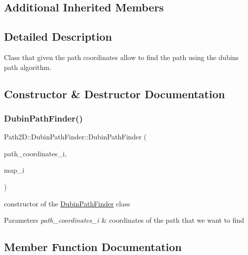 \subsection*{Additional Inherited Members}


\subsection{Detailed Description}
Class that given the path coordinates allow to find the path using the dubins path algorithm. 

\subsection{Constructor \& Destructor Documentation}
\mbox{\label{class_path2_d_1_1_dubin_path_finder_a663ec1b97f56c4a36cbe242752d1253a}} 
\subsubsection{\texorpdfstring{Dubin\+Path\+Finder()}{DubinPathFinder()}}
{\footnotesize\ttfamily Path2\+D\+::\+Dubin\+Path\+Finder\+::\+Dubin\+Path\+Finder (\begin{DoxyParamCaption}\item[{\mbox{\hyperlink{class_path2_d_1_1_element_1_1_path_coordinates}{Path\+Coordinates}}}]{path\+\_\+coordinates\+\_\+i,  }\item[{\mbox{\hyperlink{class_map}{Map}} $\ast$}]{map\+\_\+i }\end{DoxyParamCaption})}



constructor of the \mbox{\hyperlink{class_path2_d_1_1_dubin_path_finder}{Dubin\+Path\+Finder}} class 


\begin{DoxyParams}{Parameters}
{\em path\+\_\+coordinates\+\_\+i} & coordinates of the path that we want to find \\
\hline
\end{DoxyParams}


\subsection{Member Function Documentation}
\mbox{\label{class_path2_d_1_1_dubin_path_finder_abc1e93ad55c02aec66807fea41729ff6}} 
